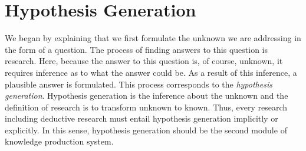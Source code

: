 \documentclass{book}
\begin{document}








\section{Hypothesis Generation}
We began by explaining that we first formulate the unknown we are addressing in the form of a question. The process of finding answers to this question is research. Here, because the answer to this question is, of course, unknown, it requires inference as to what the answer could be. As a result of this inference, a plausible answer is formulated. This process corresponds to the \textit{hypothesis generation}. Hypothesis generation is the inference about the unknown and the definition of research is to transform unknown to known. Thus, every research including deductive research must entail hypothesis generation implicitly or explicitly. In this sense, hypothesis generation should be the second module of knowledge production system.
\end{document}
